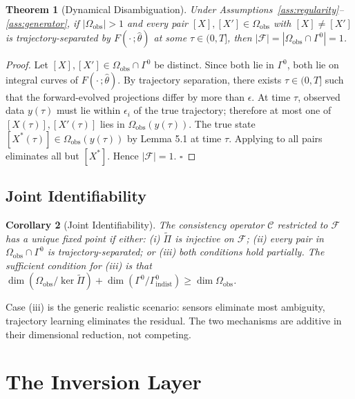 \documentclass[12pt, oneside]{article}
\newtheorem{theorem}{Theorem}[section]
\newtheorem{corollary}[theorem]{Corollary}
\newcommand{\Ftil}{\widetilde{\Pi}}
\begin{document}
\begin{theorem}[Dynamical Disambiguation]
\label{thm:disambiguation}
Under Assumptions~\ref{ass:regularity}--\ref{ass:generator}, if $|\Omega_{\mathrm{obs}}| > 1$
and every pair $[X],[X'] \in \Omega_{\mathrm{obs}}$ with $[X] \ne [X']$ is
trajectory-separated by $F(\cdot\,;\hat{\theta})$ at some $\tau \in (0,T]$, then
$|\mathcal{F}| = |\Omega_{\mathrm{obs}} \cap \Gamma^0| = 1$.
\end{theorem}

\begin{proof}
Let $[X],[X'] \in \Omega_{\mathrm{obs}} \cap \Gamma^0$ be distinct. Since both lie in
$\Gamma^0$, both lie on integral curves of $F(\cdot\,;\hat{\theta})$. By trajectory
separation, there exists $\tau \in (0,T]$ such that the forward-evolved projections differ
by more than $\epsilon$. At time $\tau$, observed data $y(\tau)$ must lie within $\epsilon_i$
of the true trajectory; therefore at most one of $[X(\tau)],[X'(\tau)]$ lies in
$\Omega_{\mathrm{obs}}(y(\tau))$. The true state $[X^*(\tau)] \in \Omega_{\mathrm{obs}}(y(\tau))$
by Lemma 5.1 at time $\tau$. Applying to all pairs eliminates all but $[X^*]$.
Hence $|\mathcal{F}| = 1$. $\square$
\end{proof}

\subsection{Joint Identifiability}

\begin{corollary}[Joint Identifiability]
The consistency operator $\mathcal{C}$ restricted to $\mathcal{F}$ has a unique fixed point
if either: (i) $\Ftil$ is injective on $\mathcal{F}$; (ii) every pair in
$\Omega_{\mathrm{obs}} \cap \Gamma^0$ is trajectory-separated; or (iii) both conditions
hold partially. The sufficient condition for (iii) is that $\dim(\Omega_{\mathrm{obs}}/\ker\Ftil)
+ \dim(\Gamma^0/\Gamma^0_{\mathrm{indist}}) \ge \dim\Omega_{\mathrm{obs}}$.
\end{corollary}

Case (iii) is the generic realistic scenario: sensors eliminate most ambiguity, trajectory
learning eliminates the residual. The two mechanisms are additive in their dimensional
reduction, not competing.

\section{The Inversion Layer}
\label{sec:inversion}
\end{document}
